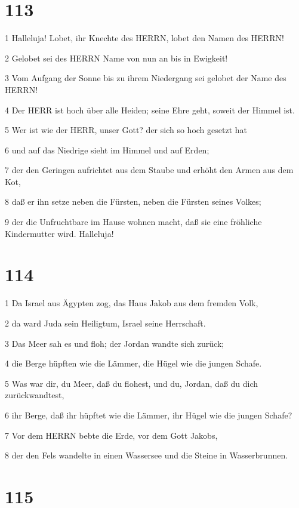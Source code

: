 \chapter{113}

\par 1 Halleluja! Lobet, ihr Knechte des HERRN, lobet den Namen des HERRN!
\par 2 Gelobet sei des HERRN Name von nun an bis in Ewigkeit!
\par 3 Vom Aufgang der Sonne bis zu ihrem Niedergang sei gelobet der Name des HERRN!
\par 4 Der HERR ist hoch über alle Heiden; seine Ehre geht, soweit der Himmel ist.
\par 5 Wer ist wie der HERR, unser Gott? der sich so hoch gesetzt hat
\par 6 und auf das Niedrige sieht im Himmel und auf Erden;
\par 7 der den Geringen aufrichtet aus dem Staube und erhöht den Armen aus dem Kot,
\par 8 daß er ihn setze neben die Fürsten, neben die Fürsten seines Volkes;
\par 9 der die Unfruchtbare im Hause wohnen macht, daß sie eine fröhliche Kindermutter wird. Halleluja!

\chapter{114}

\par 1 Da Israel aus Ägypten zog, das Haus Jakob aus dem fremden Volk,
\par 2 da ward Juda sein Heiligtum, Israel seine Herrschaft.
\par 3 Das Meer sah es und floh; der Jordan wandte sich zurück;
\par 4 die Berge hüpften wie die Lämmer, die Hügel wie die jungen Schafe.
\par 5 Was war dir, du Meer, daß du flohest, und du, Jordan, daß du dich zurückwandtest,
\par 6 ihr Berge, daß ihr hüpftet wie die Lämmer, ihr Hügel wie die jungen Schafe?
\par 7 Vor dem HERRN bebte die Erde, vor dem Gott Jakobs,
\par 8 der den Fels wandelte in einen Wassersee und die Steine in Wasserbrunnen.

\chapter{115}

